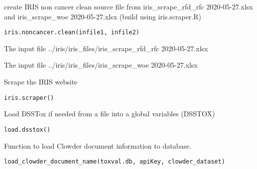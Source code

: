 \documentclass[letterpaper]{book}
\begin{document}
%
\begin{Description}\relax
create IRIS non cancer clean source file from iris\_scrape\_rfd\_rfc 2020-05-27.xlsx 
and iris\_scrape\_woe 2020-05-27.xlsx (build using iris.scraper.R)
\end{Description}
%
\begin{Usage}
\begin{verbatim}
iris.noncancer.clean(infile1, infile2)
\end{verbatim}
\end{Usage}
%
\begin{Arguments}
\begin{ldescription}
\item[\code{infile1}] The input file ../iris/iris\_files/iris\_scrape\_rfd\_rfc 2020-05-27.xlsx

\item[\code{infile2}] The input file ../iris/iris\_files/iris\_scrape\_woe 2020-05-27.xlsx
\end{ldescription}
\end{Arguments}
%
\begin{Description}\relax
Scrape the IRIS website
\end{Description}
%
\begin{Usage}
\begin{verbatim}
iris.scraper()
\end{verbatim}
\end{Usage}
%
\begin{Description}\relax
Load DSSTox if needed from a file into a global variables (DSSTOX)
\end{Description}
%
\begin{Usage}
\begin{verbatim}
load.dsstox()
\end{verbatim}
\end{Usage}
%
\begin{Description}\relax
Function to load Clowder document information to database.
\end{Description}
%
\begin{Usage}
\begin{verbatim}
load_clowder_document_name(toxval.db, apiKey, clowder_dataset)
\end{verbatim}
\end{Usage}
\end{document}
